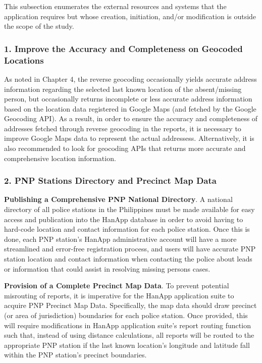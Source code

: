 This subsection enumerates the external resources and systems that the application requires but whose creation, initiation, and/or modification is outside the scope of the study. 

\subsubsection{1. Improve the Accuracy and Completeness on Geocoded Locations}

As noted in Chapter 4, the reverse geocoding occasionally yields accurate address information regarding the selected last known location of the absent/missing person, but occasionally returns incomplete or less accurate address information based on the location data registered in Google Maps (and fetched by the Google Geocoding API). As a result, in order to ensure the accuracy and completeness of addresses  fetched through reverse geocoding in the reports, it is necessary to improve Google Maps data to represent the actual addressess. Alternatively, it is also  recommended to look for geocoding APIs that returns more accurate and comprehensive location information.

\subsubsection{2. PNP Stations Directory and Precinct Map Data} 

\textbf{Publishing a Comprehensive PNP National Directory}. A national directory of all police stations in the Philippines must be made available for easy access and publication into the HanApp database in order to avoid having to hard-code location and contact information for each police station. Once this is done, each PNP station's HanApp administrative account will have a more streamlined and error-free registration process, and users will have accurate PNP station location and contact information when contacting the police about leads or information that could assist in resolving missing persons cases.

\textbf{Provision of a Complete Precinct Map Data}. To prevent potential misrouting of reports, it is imperative for the HanApp application suite to acquire PNP Precinct Map Data. Specifically, the map data should draw precinct (or area of jurisdiction) boundaries for each police station. Once provided, this will require modifications in HanApp application suite’s report routing function such that, instead of using distance calculations, all reports will be routed to the appropriate PNP station if the last known location’s longitude and latitude fall within the PNP station’s precinct boundaries.

